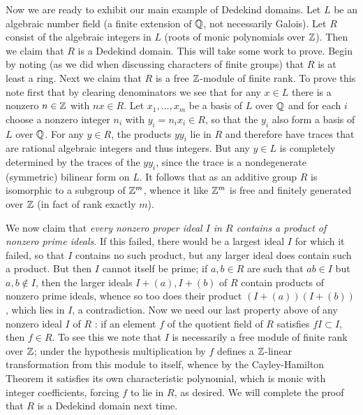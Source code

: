 \documentclass[10pt]{article}
\begin{document}
Now we are ready to exhibit our main example of Dedekind domains. Let
$L$ be an algebraic number field (a finite extension of $\Bbb Q$, not
necessarily Galois). Let $R$ consist of the algebraic integers in $L$
(roots of monic polynomials over $\Bbb Z$). Then we claim that $R$ is a
Dedekind domain. This will take some work to prove. Begin by noting (as
we did when discussing characters of finite groups) that $R$ is at least
a ring. Next we claim that $R$ is a free $\Bbb Z$-module of finite rank.
To prove this note first that by clearing denominators we see that for
any $x\in L$ there is a nonzero $n\in\Bbb Z$ with $nx\in R$. Let
$x_1,\ldots,x_m$ be a basis of $L$ over $\Bbb Q$ and for each $i$ choose
a nonzero integer $n_i$ with $y_i = n_i x_i\in R$, so that the $y_i$
also form a basis of $L$ over $\Bbb Q$. For any $y\in R$, the products
$yy_i$ lie in $R$ and therefore have traces that are rational algebraic
integers and thus integers. But any $y\in L$ is completely determined by
the traces of the $yy_i$, since the trace is a nondegenerate (symmetric)
bilinear form on $L$. It follows that as an additive group $R$ is
isomorphic to a subgroup of $\Bbb Z^m$, whence it like $\Bbb Z^m$ is
free and finitely generated over $\Bbb Z$ (in fact of rank exactly $m$).

We now claim that {\sl every nonzero proper ideal $I$ in $R$ contains a
  product of nonzero prime ideals}. If this failed, there would be a
largest ideal $I$ for which it failed, so that $I$ contains no such
product, but any larger ideal does contain such a product. But then $I$
cannot itself be prime; if $a,b\in R$ are such that $ab\in I$ but
$a,b\notin I$, then the larger ideals $I+(a),I+(b)$ of $R$ contain
products of nonzero prime ideals, whence so too does their product
$(I+(a))(I+(b))$, which lies in $I$, a contradiction. Now we need our
last property above of any nonzero ideal $I$ of $R$ : if an element $f$
of the quotient field of $R$ satisfies $fI\subset I$, then $f\in R$. To
see this we note that $I$ is necessarily a free module of finite rank
over $\Bbb Z$; under the hypothesis multiplication by $f$ defines a
$\Bbb Z$-linear transformation from this module to itself, whence by the
Cayley-Hamilton Theorem it satisfies its own characteristic polynomial,
which is monic with integer coefficients, forcing $f$ to lie in $R$, as
desired. We will complete the proof that $R$ is a Dedekind domain next
time.
\end{document}
